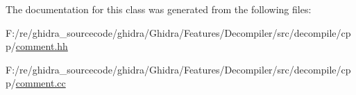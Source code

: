 The documentation for this class was generated from the following files\+:\begin{DoxyCompactItemize}
\item 
F\+:/re/ghidra\+\_\+sourcecode/ghidra/\+Ghidra/\+Features/\+Decompiler/src/decompile/cpp/\mbox{\hyperlink{comment_8hh}{comment.\+hh}}\item 
F\+:/re/ghidra\+\_\+sourcecode/ghidra/\+Ghidra/\+Features/\+Decompiler/src/decompile/cpp/\mbox{\hyperlink{comment_8cc}{comment.\+cc}}\end{DoxyCompactItemize}
